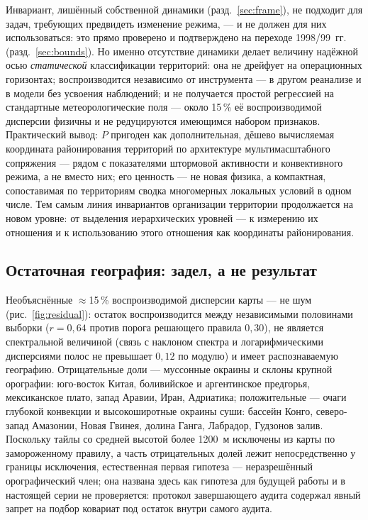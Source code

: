 \documentclass[11pt,a4paper]{article}
\begin{document}
Инвариант, лишённый собственной динамики (разд.~\ref{sec:frame}), не подходит для задач, требующих предвидеть изменение режима, --- и не должен для них использоваться: это прямо проверено и подтверждено на переходе 1998/99~гг. (разд.~\ref{sec:bounds}). Но именно отсутствие динамики делает величину надёжной осью \emph{статической} классификации территорий: она не дрейфует на операционных горизонтах; воспроизводится независимо от инструмента --- в другом реанализе и в модели без усвоения наблюдений; и не получается простой регрессией на стандартные метеорологические поля --- около 15\,\% её воспроизводимой дисперсии физичны и не редуцируются имеющимся набором признаков. Практический вывод: $P$ пригоден как дополнительная, дёшево вычисляемая координата районирования территорий по архитектуре мультимасштабного сопряжения --- рядом с показателями штормовой активности и конвективного режима, а не вместо них; его ценность --- не новая физика, а компактная, сопоставимая по территориям сводка многомерных локальных условий в одном числе. Тем самым линия инвариантов организации территории \cite{Puzachenko1986,Puzachenko2004,Puzachenko2010,Krenke2019} продолжается на новом уровне: от выделения иерархических уровней --- к измерению их отношения и к использованию этого отношения как координаты районирования.

\subsection{Остаточная география: задел, а не результат}

Необъяснённые $\approx$15\,\% воспроизводимой дисперсии карты --- не шум (рис.~\ref{fig:residual}): остаток воспроизводится между независимыми половинами выборки ($r=0{,}64$ против порога решающего правила $0{,}30$), не является спектральной величиной (связь с наклоном спектра и логарифмическими дисперсиями полос не превышает $0{,}12$ по модулю) и имеет распознаваемую географию. Отрицательные доли --- муссонные окраины и склоны крупной орографии: юго-восток Китая, боливийское и аргентинское предгорья, мексиканское плато, запад Аравии, Иран, Адриатика; положительные --- очаги глубокой конвекции и высокоширотные окраины суши: бассейн Конго, северо-запад Амазонии, Новая Гвинея, долина Ганга, Лабрадор, Гудзонов залив. Поскольку тайлы со средней высотой более 1200~м исключены из карты по замороженному правилу, а часть отрицательных долей лежит непосредственно у границы исключения, естественная первая гипотеза --- неразрешённый орографический член; она названа здесь как гипотеза для будущей работы и в настоящей серии не проверяется: протокол завершающего аудита содержал явный запрет на подбор ковариат под остаток внутри самого аудита.
\end{document}
